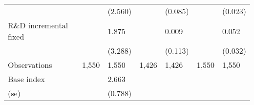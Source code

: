 {\begin{tabular}{l*{6}{l}}
                    &               &     (2.560)   &               &     (0.085)   &               &     (0.023)   \\
R\&D incremental fixed&               &       1.875   &               &       0.009   &               &       0.052   \\
                    &               &     (3.288)   &               &     (0.113)   &               &     (0.032)   \\
Observations        &       1,550   &       1,550   &       1,426   &       1,426   &       1,550   &       1,550   \\
Base index          &               &       2.663   &               &               &               &               \\
(se)                &               &     (0.788)   &               &               &               &               \\
\hline
\end{tabular}}

